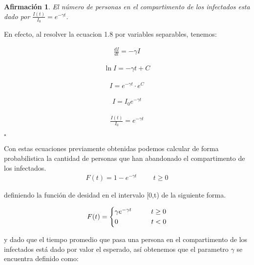 \documentclass[a4paper,openany,12pt]{book}
\newtheorem{Af}{Afirmación}
\begin{document}
\begin{Af}
El número de personas en el compartimento de los infectados esta dado por $\frac{I(t)}{I_{0}} = e^{-\gamma t}$.
\end{Af}

\begin{Dem}
En efecto, al resolver la ecuacion 1.8 por variables separables, tenemos: 

\begin{align*}
\frac{dI}{dt} = - \gamma I
\end{align*}

\begin{align*}
\ln{I} = - \gamma t + C
\end{align*}

\begin{align*}
I = e^{- \gamma t} \cdot e^{C}
\end{align*}

\begin{align*}
I = I_{0} e^{- \gamma t}
\end{align*}

\begin{align*}
\frac{I(t)}{I_{0}} = e^{-\gamma t}
\end{align*}

\hfill	$\square$

\end{Dem}

Con estas ecuaciones previamente obtenidas podemos calcular de forma probabilistica la cantidad de personas que han abandonado el compartimento de los infectados.
\begin{align}
F(t) = 1 -  e^{-\gamma t} \hspace{1cm} t \geq  0
\end{align}

definiendo la función de desidad en el intervalo [0,t) de la siguiente forma.

\begin{equation*}
F(t) =
\begin{cases*}
\gamma e^{-\gamma t} \hspace{1cm} t \geq  0 \\
0 \hspace{1.7cm} t <  0
\end{cases*}
\end{equation*}

y dado que el tiempo promedio que pasa una persona en el compartimento de los infectados está dado por valor el esperado, así obtenemos que el parametro $\gamma$ se encuentra definido como: 
\end{document}
